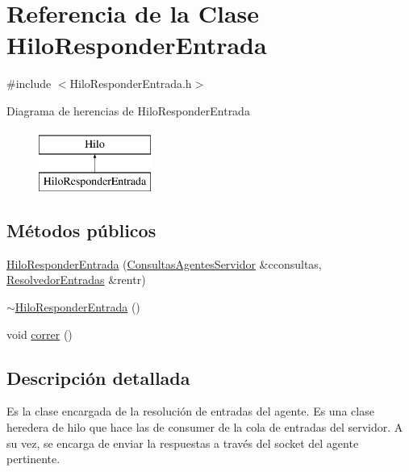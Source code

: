 \hypertarget{classHiloResponderEntrada}{\section{\-Referencia de la \-Clase \-Hilo\-Responder\-Entrada}
\label{classHiloResponderEntrada}
}


{\ttfamily \#include $<$\-Hilo\-Responder\-Entrada.\-h$>$}

\-Diagrama de herencias de \-Hilo\-Responder\-Entrada\begin{figure}[H]
\begin{center}
\leavevmode
\includegraphics[height=2.000000cm]{classHiloResponderEntrada}
\end{center}
\end{figure}
\subsection*{\-Métodos públicos}
\begin{DoxyCompactItemize}
\item 
\hyperlink{classHiloResponderEntrada_a119af6408470efacfd792ad0bed927e3}{\-Hilo\-Responder\-Entrada} (\hyperlink{classBLQueue}{\-Consultas\-Agentes\-Servidor} \&cconsultas, \hyperlink{classResolvedorEntradas}{\-Resolvedor\-Entradas} \&rentr)
\item 
\hyperlink{classHiloResponderEntrada_af4930fabd3f5a9fd45132bb8ff8a1981}{$\sim$\-Hilo\-Responder\-Entrada} ()
\item 
void \hyperlink{classHiloResponderEntrada_afb23d9181ce6bb9e5ceff8e2394c4518}{correr} ()
\end{DoxyCompactItemize}


\subsection{\-Descripción detallada}
\-Es la clase encargada de la resolución de entradas del agente. \-Es una clase heredera de hilo que hace las de consumer de la cola de entradas del servidor. \-A su vez, se encarga de enviar la respuestas a través del socket del agente pertinente. 

